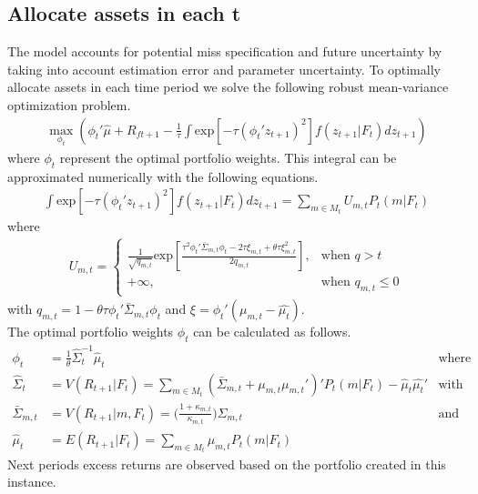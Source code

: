 \subsection{Allocate assets in each t}
The model accounts for potential miss specification and future uncertainty by taking into account estimation error and parameter uncertainty. To optimally allocate assets in each time period we solve the following robust mean-variance optimization problem. 
\begin{align*}
\max_{\phi_t}(\phi_{t}'\hat{\mu} + R_{ft+1} - \frac{1}{\tau}\int \text{exp} [-\tau(\phi_{t}'z_{t+1})^2]f(z_{t+1} | F_t)d z_{t+1})
\end{align*}
where $\phi_t$ represent the optimal portfolio weights. This integral can be approximated numerically with the following equations. 
\begin{align*}
\int \text{exp} [-\tau(\phi_{t}'z_{t+1})^2]f(z_{t+1} | F_t)d z_{t+1} = \sum_{m \in M_t} U_{m,t}P_t(m|F_t)
\end{align*}
where
\begin{align*}
    U_{m,t} =\left\{
                \begin{array}{ll}
                  \frac{1}{\sqrt{q_{m,t}}} \text{exp} [\frac{\tau^2 \phi_{t}' \bar{\Sigma}_{m,t} \phi_t - 2 \tau \xi_{m,t} + \theta \tau \xi_{m,t}^2}{2 q_{m,t}}], &\text{when  } q > t\\
                  + \infty,  &\text{when } q_{m,t} \leq 0
                \end{array}
              \right.
\end{align*}
with $q_{m,t} = 1 - \theta \tau \phi_{t}'\bar{\Sigma}_{m,t} \phi_t$ and $\xi = \phi_{t}'(\mu_{m,t} - \hat{\mu_t})$.\\
The optimal portfolio weights $\phi_t$ can be calculated as follows.
\begin{align*}
\phi_t &= \frac{1}{\theta}\hat{\Sigma}_t^{-1}\hat{\mu}_t &\text{where }\\
\hat{\Sigma}_{t} &= V(R_{t+1} | F_t)= \sum_{m \in M_t} (\bar{\Sigma}_{m,t} + \mu_{m,t}\mu_{m,t}')'P_t(m|F_t)-\hat{\mu}_t \hat{\mu_t}' &\text{with }\\
\bar{\Sigma}_{m,t} &= V(R_{t+1} |m, F_t) = \Big(\frac{1+\kappa_{m,t}}{\kappa_{m,t}}\Big) \Sigma_{m,t}& \text{and }\\
\hat{\mu}_t & = E(R_{t+1} |F_t) = \sum_{m \in M_t} \mu_{m,t} P_t(m | F_t)
\end{align*}
Next periods excess returns are observed based on the portfolio created in this instance. 